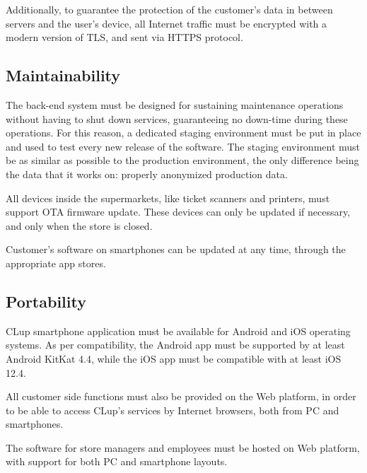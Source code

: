\documentclass[../../main.tex]{subfiles}
\begin{document}
	Additionally, to guarantee the protection of the customer's data in between servers and the 
	user's device, all Internet traffic must be encrypted with a modern version of TLS, and sent via HTTPS protocol.


	\subsection{Maintainability}

	The back-end system must be designed for sustaining maintenance operations without having to 
	shut down services, guaranteeing no down-time during these operations. For this reason, a dedicated staging environment must be put in place and used to test every new release of the software. The staging environment must be as similar as possible to the production environment, the only difference being the data that it works on: properly anonymized production data.

	All devices inside the supermarkets, like ticket scanners and printers, must support OTA firmware update. These devices can only be updated if necessary, and only when the store is closed.

	Customer's software on smartphones can be updated at any time, through the appropriate app stores.

	\subsection{Portability}

	CLup smartphone application must be available for Android and iOS operating systems. As per compatibility, the Android app must be supported by at least Android KitKat 4.4, while the iOS app must be compatible with at least iOS 12.4.

	All customer side functions must also be provided on the Web platform, in order to be able to access 
	CLup's services by Internet browsers, both from PC and smartphones.

	The software for store managers and employees must be hosted on Web platform, with support for both PC and smartphone layouts.

	
\end{document}
